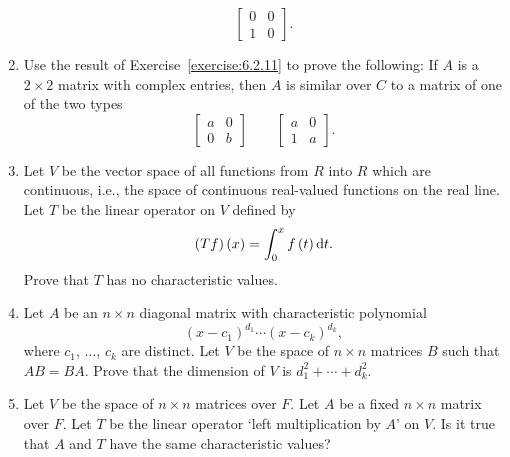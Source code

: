 \begin{enumerate}
        \begin{equation*}
            \begin{bmatrix}
                0 & 0 \\
                1 & 0
            \end{bmatrix}
            .
        \end{equation*}
    \item Use the result of Exercise~\ref{exercise:6.2.11} to prove the following: If \(A\) is a \(2\times2\) matrix with complex entries, then \(A\) is similar over \(C\) to a matrix of one of the two types
        \begin{equation*}
            \begin{bmatrix}
                a & 0 \\
                0 & b
            \end{bmatrix}
            \qquad
            \begin{bmatrix}
                a & 0 \\
                1 & a
            \end{bmatrix}
            .
        \end{equation*}
    \item Let \(V\) be the vector space of all functions from \(R\) into \(R\) which are continuous, i.e., the space of continuous real-valued functions on the real line. Let \(T\) be the linear operator on \(V\) defined by
        \begin{equation*}
            \left(Tf\right)\left(x\right)=\int_0^xf\left(t\right)\odif{t}.
        \end{equation*}
        Prove that \(T\) has no characteristic values.
    \item Let \(A\) be an \(n\times n\) diagonal matrix with characteristic polynomial
        \begin{equation*}
            \left(x-c_1\right)^{d_1}\cdots\left(x-c_k\right)^{d_k},
        \end{equation*}
        where \(c_1\), \(\ldots\), \(c_k\) are distinct. Let \(V\) be the space of \(n\times n\) matrices \(B\) such that \(AB=BA\). Prove that the dimension of \(V\) is \(d_1^2+\cdots+d_k^2\).
    \item Let \(V\) be the space of \(n\times n\) matrices over \(F\). Let \(A\) be a fixed \(n\times n\) matrix over \(F\). Let \(T\) be the linear operator `left multiplication by \(A\)' on \(V\). Is it true that \(A\) and \(T\) have the same characteristic values?
\end{enumerate}

